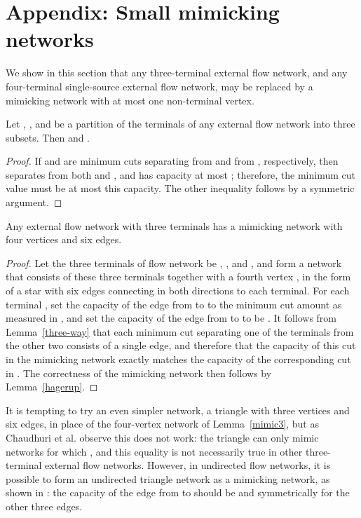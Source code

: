 \documentclass[runningheads]{llncs}
\begin{document}
{\raggedright

}



\newpage
\section*{Appendix: Small mimicking networks}

We show in this section that any three-terminal external flow network, and any four-terminal single-source external flow network, may be replaced by a mimicking network with at most one non-terminal vertex.

\begin{lemma}
\label{three-way}
Let , , and  be a partition of the terminals of any external flow network into three subsets.
Then  and
.
\end{lemma}

\begin{proof}
If  and  are minimum cuts separating  from  and  from , respectively, then  separates  from both  and , and has capacity at most ; therefore, the minimum cut value  must be at most this capacity. The other inequality follows by a symmetric argument.
\end{proof}

\begin{lemma}
\label{mimic3}
Any external flow network with three terminals has a mimicking network with four vertices and six edges.
\end{lemma}

\begin{proof}
Let the three terminals of flow network  be , , and , and form a network that consists of these three terminals together with a fourth vertex , in the form of a star  with six edges connecting  in both directions to each terminal. For each terminal , set the capacity of the edge from  to  to the minimum cut amount  as measured in , and set the capacity of the edge from  to  to be .
It follows from Lemma~\ref{three-way} that each minimum cut separating one of the terminals from the other two consists of a single edge, and therefore that the capacity of this cut in the mimicking network exactly matches the capacity of the corresponding cut in . The correctness of the mimicking network then follows by Lemma~\ref{hagerup}.
\end{proof}

It is tempting to try an even simpler network, a triangle with three vertices and six edges, in place of the four-vertex network of Lemma~\ref{mimic3}, but as Chaudhuri et al. observe this does not work: the triangle can only mimic networks for which , and this equality is not necessarily true in other three-terminal external flow networks. However, in undirected flow networks, it is possible to form an undirected triangle network as a mimicking network, as shown in \cite{cswz-cmn-00}: the capacity of the edge from  to  should be  and symmetrically for the other three edges.
\end{document}
